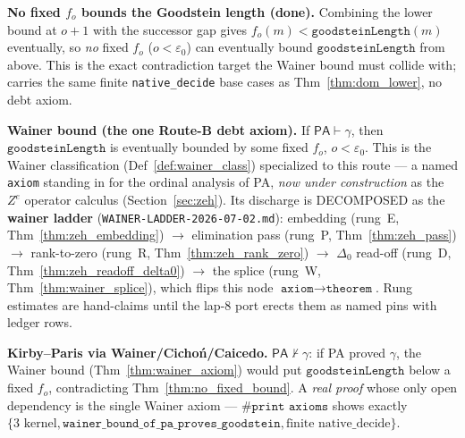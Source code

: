 \begin{theorem}\label{thm:no_fixed_bound}
  \leanok
\textbf{No fixed \(f_o\) bounds the Goodstein length (done).}  Combining the lower bound at \(o+1\) with
the successor gap gives \(f_o(m) < \texttt{goodsteinLength}(m)\) eventually, so \emph{no} fixed
\(f_o\) (\(o<\varepsilon_0\)) can eventually bound \(\texttt{goodsteinLength}\) from above.  This is the
exact contradiction target the Wainer bound must collide with; carries the same finite
\texttt{native\_decide} base cases as Thm~\ref{thm:dom_lower}, no debt axiom.
\end{theorem}

\begin{theorem}\label{thm:wainer_axiom}
  \leanok
\textbf{Wainer bound (the one Route-B debt axiom).}  If \(\mathsf{PA}\vdash\gamma\), then
\(\texttt{goodsteinLength}\) is eventually bounded by some fixed \(f_o\), \(o<\varepsilon_0\).  This is
the Wainer classification (Def~\ref{def:wainer_class}) specialized to this route --- a named
\texttt{axiom} standing in for the ordinal analysis of PA, \emph{now under construction} as the
\(Z^{e}\) operator calculus (Section~\ref{sec:zeh}).  Its discharge is DECOMPOSED as the
\textbf{wainer ladder} (\texttt{WAINER-LADDER-2026-07-02.md}): embedding (rung~E,
Thm~\ref{thm:zeh_embedding}) \(\to\) elimination pass (rung~P, Thm~\ref{thm:zeh_pass}) \(\to\)
rank-to-zero (rung~R, Thm~\ref{thm:zeh_rank_zero}) \(\to\) \(\Delta_0\) read-off (rung~D,
Thm~\ref{thm:zeh_readoff_delta0}) \(\to\) the splice (rung~W, Thm~\ref{thm:wainer_splice}), which
flips this node \(\texttt{axiom}\to\texttt{theorem}\).  Rung estimates are hand-claims until the
lap-8 port erects them as named pins with ledger rows.
\end{theorem}

\begin{theorem}\label{thm:routeB_headline}
  \leanok
\textbf{Kirby--Paris via Wainer/Cichoń/Caicedo.}  \(\mathsf{PA}\nvdash\gamma\): if PA proved
\(\gamma\), the Wainer bound (Thm~\ref{thm:wainer_axiom}) would put \(\texttt{goodsteinLength}\) below a
fixed \(f_o\), contradicting Thm~\ref{thm:no_fixed_bound}.  A \emph{real proof} whose only open
dependency is the single Wainer axiom --- \(\texttt{\#print axioms}\) shows exactly
\(\{\text{3 kernel}, \texttt{wainer\_bound\_of\_pa\_proves\_goodstein}, \text{finite native\_decide}\}\).
\end{theorem}

